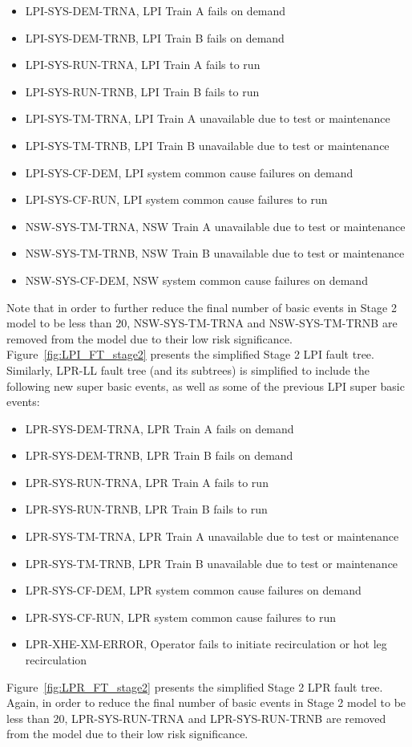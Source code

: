 \begin{itemize}
    \item LPI-SYS-DEM-TRNA, LPI Train A fails on demand 
    \item LPI-SYS-DEM-TRNB, LPI Train B fails on demand
    \item LPI-SYS-RUN-TRNA, LPI Train A fails to run
    \item LPI-SYS-RUN-TRNB, LPI Train B fails to run
    \item LPI-SYS-TM-TRNA, LPI Train A unavailable due to test or maintenance
    \item LPI-SYS-TM-TRNB, LPI Train B unavailable due to test or maintenance
    \item LPI-SYS-CF-DEM, LPI system common cause failures on demand 
    \item LPI-SYS-CF-RUN, LPI system common cause failures to run
    \item NSW-SYS-TM-TRNA, NSW Train A unavailable due to test or maintenance
    \item NSW-SYS-TM-TRNB, NSW Train B unavailable due to test or maintenance
    \item NSW-SYS-CF-DEM, NSW system common cause failures on demand
\end{itemize}
Note that in order to further reduce the final number of basic events in Stage 2 model to be less than 20, NSW-SYS-TM-TRNA and NSW-SYS-TM-TRNB are removed from the model due to their low risk significance. Figure~\ref{fig:LPI_FT_stage2} presents the simplified Stage 2 LPI fault tree. 
Similarly, LPR-LL fault tree (and its subtrees) is simplified to include the following new super basic events, as well as some of the previous LPI super basic events: 
\begin{itemize}
    \item LPR-SYS-DEM-TRNA, LPR Train A fails on demand 
    \item LPR-SYS-DEM-TRNB, LPR Train B fails on demand
    \item LPR-SYS-RUN-TRNA, LPR Train A fails to run
    \item LPR-SYS-RUN-TRNB, LPR Train B fails to run
    \item LPR-SYS-TM-TRNA, LPR Train A unavailable due to test or maintenance
    \item LPR-SYS-TM-TRNB, LPR Train B unavailable due to test or maintenance
    \item LPR-SYS-CF-DEM, LPR system common cause failures on demand 
    \item LPR-SYS-CF-RUN, LPR system common cause failures to run
    \item LPR-XHE-XM-ERROR, Operator fails to initiate recirculation or hot leg recirculation
\end{itemize}
Figure~\ref{fig:LPR_FT_stage2} presents the simplified Stage 2 LPR fault tree. Again, in order to reduce the final number of basic events in Stage 2 model to be less than 20, LPR-SYS-RUN-TRNA and LPR-SYS-RUN-TRNB are removed from the model due to their low risk significance.

